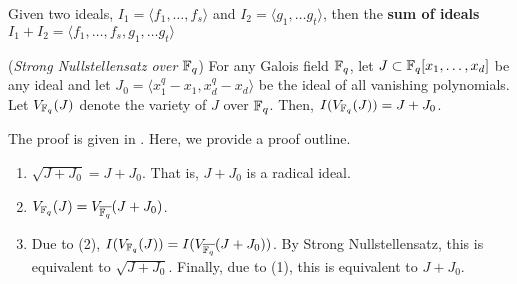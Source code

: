 \begin{Definition}
Given two ideals, $I_1=\langle f_1, \dots,f_s \rangle$ and 
$I_2=\langle g_1,\dots g_t\rangle$, then the {\bf sum of ideals} 
$I_1+I_2=\langle f_1,\dots,f_s,g_1,\dots g_t\rangle$
\end{Definition}

\begin{Theorem}
({\it Strong Nullstellensatz over ${\mathbb{F}}_{q}$})
For any Galois field ${\mathbb{F}}_{q}$, let $J \subset {\mathbb{F}}_{q}[x_1,\dots,x_d]$ be any ideal 
and let $J_0 = \langle x_1^q-x_1, x_d^q-x_d \rangle$ be the ideal of all
vanishing polynomials. Let $V_{{\mathbb{F}}_{q}}(J)$ denote the variety of $J$ over ${\mathbb{F}}_{q}$.
Then, $I(V_{{\mathbb{F}}_{q}}(J))=J+J_0$.
\end{Theorem}

The proof is given in \cite{gao:gf-gb-ms}. Here, we provide a proof outline.

\begin{Proof}
\begin{enumerate}
\item $\sqrt{J+J_0} = J+J_0$. That is, $J+J_0$ is a radical ideal.
\item $V_{{\mathbb{F}}_{q}}(J)=V_{\overline{{\mathbb{F}}_{q}}}(J+J_0)$.
\item Due to (2), $I(V_{{\mathbb{F}}_{q}}(J)) = I(V_{\overline{{\mathbb{F}}_{q}}}(J+J_0))$. 
By Strong Nullstellensatz, this is equivalent to $\sqrt{J+J_0}$.
Finally, due to (1), this is equivalent to $J+J_0$.
\end{enumerate}
\end{Proof}




